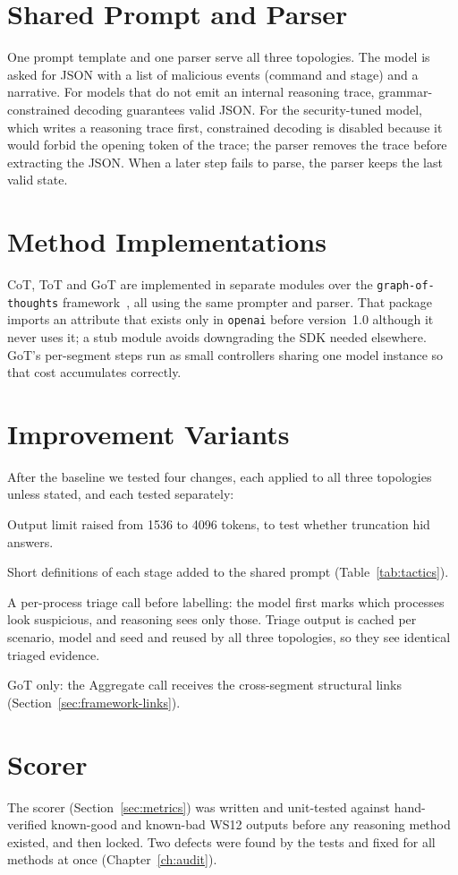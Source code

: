 \section{Shared Prompt and Parser}
One prompt template and one parser serve all three topologies. The model is asked for JSON with a list of malicious events (command and stage) and a narrative. For models that do not emit an internal reasoning trace, grammar-constrained decoding guarantees valid JSON. For the security-tuned model, which writes a reasoning trace first, constrained decoding is disabled because it would forbid the opening token of the trace; the parser removes the trace before extracting the JSON. When a later step fails to parse, the parser keeps the last valid state.

\section{Method Implementations}
CoT, ToT and GoT are implemented in separate modules over the \texttt{graph-of-thoughts} framework~\cite{besta2024got}, all using the same prompter and parser. That package imports an attribute that exists only in \texttt{openai} before version~1.0 although it never uses it; a stub module avoids downgrading the SDK needed elsewhere. GoT's per-segment steps run as small controllers sharing one model instance so that cost accumulates correctly.

\section{Improvement Variants}
After the baseline we tested four changes, each applied to all three topologies unless stated, and each tested separately:
\begin{description}[leftmargin=2.6em,style=nextline]
\item[v2] Output limit raised from 1536 to 4096 tokens, to test whether truncation hid answers.
\item[v3] Short definitions of each stage added to the shared prompt (Table~\ref{tab:tactics}).
\item[v4] A per-process triage call before labelling: the model first marks which processes look suspicious, and reasoning sees only those. Triage output is cached per scenario, model and seed and reused by all three topologies, so they see identical triaged evidence.
\item[v5] GoT only: the Aggregate call receives the cross-segment structural links (Section~\ref{sec:framework-links}).
\end{description}
\label{sec:framework-links}

\section{Scorer}
The scorer (Section~\ref{sec:metrics}) was written and unit-tested against hand-verified known-good and known-bad WS12 outputs before any reasoning method existed, and then locked. Two defects were found by the tests and fixed for all methods at once (Chapter~\ref{ch:audit}).
